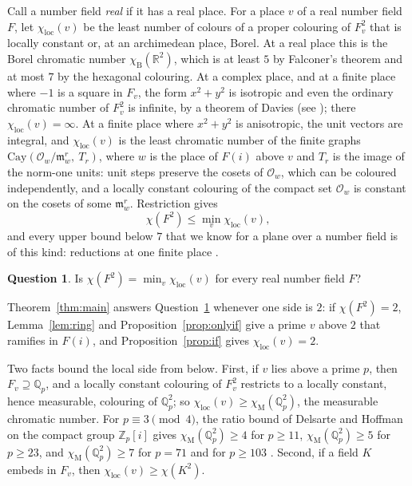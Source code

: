 \documentclass[11pt,a4paper]{amsart}
\theoremstyle{definition}
\newtheorem{question}[theorem]{Question}
\newcommand{\Q}{\mathbb{Q}}
\newcommand{\R}{\mathbb{R}}
\newcommand{\Z}{\mathbb{Z}}
\newcommand{\Oo}{\mathcal{O}}
\newcommand{\m}{\mathfrak{m}}
\newcommand{\chiB}{\chi_{\mathrm{B}}}
\newcommand{\chiM}{\chi_{\mathrm{M}}}
\newcommand{\chiloc}{\chi_{\mathrm{loc}}}
\begin{document}
Call a number field \emph{real} if it has a real place. For a place $v$ of a real number field $F$, let
$\chiloc(v)$ be the least number of colours of a proper colouring of $F_v^2$ that is locally constant or, at an
archimedean place, Borel. At a real place this is the Borel chromatic number $\chiB(\R^2)$, which is at least $5$
by Falconer's theorem \cite{Falconer} and at most $7$ by the hexagonal colouring. At a complex place, and at a
finite place where $-1$ is a square in $F_v$, the form $x^2+y^2$ is isotropic and even the ordinary chromatic
number of $F_v^2$ is infinite, by a theorem of Davies \cite{Davies} (see \cite[Proposition~3]{PP}); there
$\chiloc(v)=\infty$. At a finite place where $x^2+y^2$ is anisotropic, the unit vectors are integral, and
$\chiloc(v)$ is the least chromatic number of the finite graphs $\mathrm{Cay}(\Oo_w/\m_w^r,\ T_r)$, where $w$ is
the place of $F(i)$ above $v$ and $T_r$ is the image of the norm-one units: unit steps preserve the cosets of
$\Oo_w$, which can be coloured independently, and a locally constant colouring of the compact set $\Oo_w$ is
constant on the cosets of some $\m_w^r$. Restriction gives
\[
\chi(F^2)\le\min_v\chiloc(v),
\]
and every upper bound below $7$ that we know for a plane over a number field is of this kind: reductions at one
finite place \cite{Fischer1990,Madore,MM,Moorhouse}.

\begin{question}\label{q:lg}
Is $\chi(F^2)=\min_v\chiloc(v)$ for every real number field $F$?
\end{question}

Theorem~\ref{thm:main} answers Question~\ref{q:lg} whenever one side is $2$: if $\chi(F^2)=2$,
Lemma~\ref{lem:ring} and Proposition~\ref{prop:onlyif} give a prime $v$ above $2$ that ramifies in $F(i)$, and
Proposition~\ref{prop:if} gives $\chiloc(v)=2$.

Two facts bound the local side from below. First, if $v$ lies above a prime $p$, then $F_v\supseteq\Q_p$, and a locally
constant colouring of $F_v^2$ restricts to a locally constant, hence measurable, colouring of $\Q_p^2$; so
$\chiloc(v)\ge\chiM(\Q_p^2)$, the measurable chromatic number. For $p\equiv3\pmod4$, the ratio bound of Delsarte
and Hoffman on the compact group $\Z_p[i]$ gives $\chiM(\Q_p^2)\ge4$ for $p\ge11$, $\chiM(\Q_p^2)\ge5$ for
$p\ge23$, and $\chiM(\Q_p^2)\ge7$ for $p=71$ and for $p\ge103$ \cite[Theorem~1 and Table~1]{PP}. Second, if a
field $K$ embeds in $F_v$, then $\chiloc(v)\ge\chi(K^2)$.
\end{document}

